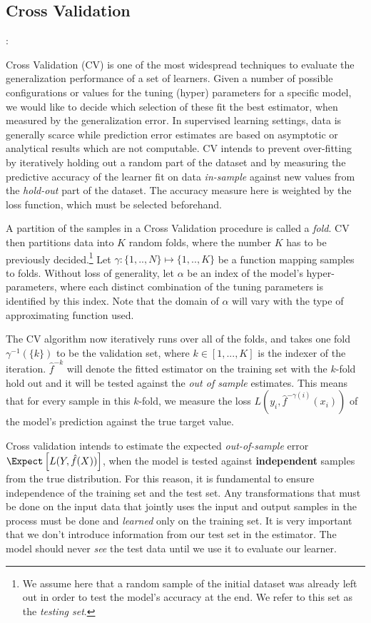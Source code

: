 \subsection{Cross Validation}:  
 
Cross Validation (CV) is one of the most widespread techniques to evaluate the generalization performance of a set of learners. Given a number of possible configurations or values for the tuning (hyper) parameters for a specific model, we would like to decide which selection of these fit the best estimator, when measured by the generalization error. In supervised learning settings, data is generally scarce while prediction error estimates are based on asymptotic or analytical results which are not computable. CV intends to prevent over-fitting by iteratively holding out a random part of the dataset and by measuring the predictive accuracy of the learner fit on data \textit{in-sample} against new values from the \textit{hold-out} part of the dataset. The accuracy measure here is weighted by the loss function, which must be selected beforehand. 
 
 A partition of the samples in a Cross Validation procedure is called a \textit{fold}. CV then partitions data into $K$ random folds, where the number $K$ has to be previously decided.\footnote{ We assume here that a random sample of the initial dataset was already left out in order to test the model's accuracy at the end. We refer to this set as the \textit{testing set}.} Let $\gamma : \{1,..,N\} \mapsto \{1, .., K\}$ be a function mapping samples to folds. Without loss of generality,  let $\alpha$ be an index of the model's hyper-parameters, where each distinct combination of the tuning parameters is identified by this index. Note that the domain of $\alpha$ will vary with the type of approximating function used.
 
 The CV algorithm now iteratively runs over all of the folds, and takes one fold $\gamma^{-1}(\{k\})$ to be the validation set, where $k \in [1,...,K]$ is the indexer of the iteration. $\hat{f}^{-k}$ will denote the fitted estimator on the training set with the $k$-fold hold out and it will be tested against the \textit{out of sample} estimates. This means that for every sample in this $k$-fold, we measure the loss $L(y_i, \hat{f}^{-\gamma(i)}(x_i))$ of the model's prediction against the true target value.
 
 Cross validation intends to estimate the expected \textit{out-of-sample} error $\Expect \left[  L(Y, \hat{f}(X)) \right]$, when the model is tested against \textbf{independent} samples from the true distribution. For this reason, it is fundamental to ensure independence of the training set and the test set. Any transformations that must be done on the input data that jointly uses the input and output samples in the process must be done and \textit{learned} only on the training set. It is very important that we don't introduce information from our test set in the estimator. The model should never \textit{see} the test data until we use it to evaluate our learner. 

